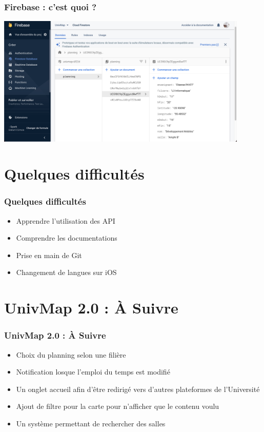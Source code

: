\documentclass{beamer}
\begin{document}
  \begin{frame}
    \frametitle{Firebase : c'est quoi ?}

    \begin{center}
      \includegraphics[width=120mm, scale=0.5]{firebase.png}
    \end{center}

  \end{frame}


%
%
\section{Quelques difficultés}
%
%
\begin{frame}
  \frametitle{Quelques difficultés}
  \begin{itemize}
    \item Apprendre l'utilisation des API
    \item Comprendre les documentations
    \item Prise en main de Git
    \item Changement de langues sur iOS
  \end{itemize}
\end{frame}
%
%
\section{UnivMap 2.0 : À Suivre}
%
%
\begin{frame}
  \frametitle{UnivMap 2.0 : À Suivre}

  \begin{itemize}
    \item Choix du planning selon une filière
    \item Notification losque l'emploi du temps est modifié
    \item Un onglet accueil afin d'être redirigé vers d'autres plateformes de l'Université
    \item Ajout de filtre pour la carte pour n'afficher que le contenu voulu
    \item Un système permettant de rechercher des salles
  \end{itemize}


\end{frame}
%
%
\end{document}
